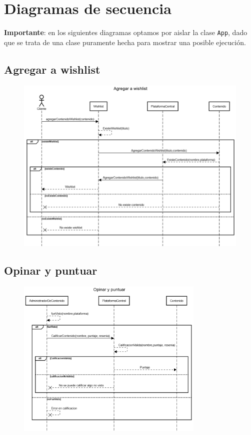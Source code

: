 ﻿\section{Diagramas de secuencia}\label{sec:diagramas}
\textbf{Importante}: en los siguientes diagramas optamos por aislar la clase \lstinline|App|, dado que se trata de una
clase puramente hecha para mostrar una posible ejecución.

\subsection{Agregar a wishlist}\label{subsec:agregar-a-wishlist}
\begin{figure}[h]
    \centering
    \includegraphics[width=1\textwidth]{img/agregar_a_wishlist}
\end{figure}

\clearpage

\subsection{Opinar y puntuar}\label{subsec:opinar-y-puntuar}
\begin{figure}[h]
    \centering
    \includegraphics[width=0.8\textwidth]{img/opinar_y_puntuar}
\end{figure}

